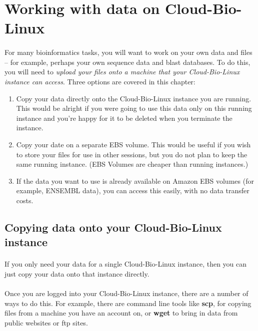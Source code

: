 \section{Working with data on Cloud-Bio-Linux}\label{section:data}

\paragraph{}For many bioinformatics tasks, you will want to work on your own data and files – for example, perhaps your own sequence data and blast databases. To do this, you will need to \emph{upload your files onto a machine that your Cloud-Bio-Linux instance can access}. Three options are covered in this chapter:
\begin{enumerate}
\item Copy your data directly onto the Cloud-Bio-Linux instance you are running. This would be alright if you were going to use this data only on this running instance and you're happy for it to be deleted when you terminate the instance.
\item Copy your date on a separate EBS volume. This would be useful if you wish to store your files for use in other sessions, but you do not plan to keep the same running instance. (EBS Volumes are cheaper than running instances.) 
\item If the data you want to use is already available on Amazon EBS volumes (for example, ENSEMBL data), you can access this easily, with no data transfer costs. 
\end{enumerate}

\subsection{Copying data onto your Cloud-Bio-Linux instance}

\paragraph{}If you only need your data for a single Cloud-Bio-Linux instance, then you can just copy your data onto that instance directly.
 
\paragraph{}Once you are logged into your Cloud-Bio-Linux instance, there are a number of ways to do this. For example, there are command line tools like \textbf{scp}, for copying files from a machine you have an account on, or \textbf{wget} to bring in data from public websites or ftp sites. 
